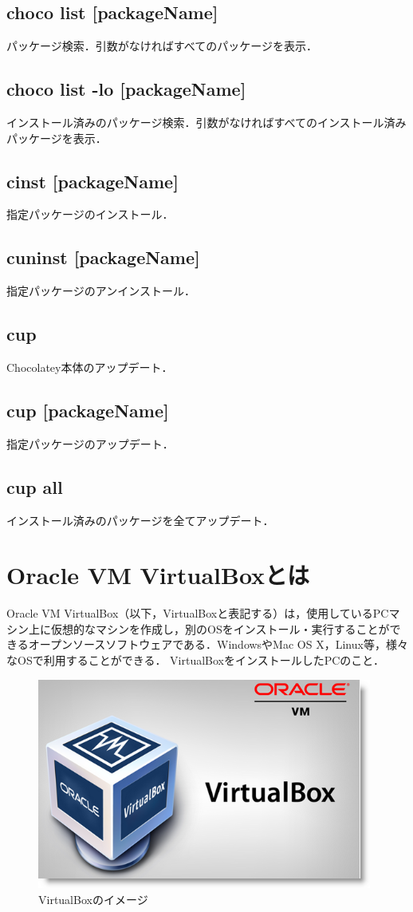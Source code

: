 \subsection{choco list [packageName]}
 パッケージ検索．引数がなければすべてのパッケージを表示．
\subsection{choco list -lo [packageName] }
インストール済みのパッケージ検索．引数がなければすべてのインストール済みパッケージを表示．
\subsection{cinst [packageName]}
 指定パッケージのインストール．
\subsection{cuninst [packageName]}
 指定パッケージのアンインストール．
\subsection{cup}
 Chocolatey本体のアップデート．
\subsection{cup [packageName]}
 指定パッケージのアップデート．
\subsection{cup all}
 インストール済みのパッケージを全てアップデート．
\clearpage

\section{Oracle VM VirtualBoxとは}
Oracle VM VirtualBox（以下，VirtualBoxと表記する）は，使用しているPCマシン上に仮想的なマシンを作成し，別のOSをインストール・実行することができるオープンソースソフトウェアである．WindowsやMac OS X，Linux等，様々なOSで利用することができる．
VirtualBoxをインストールしたPCのこと．
\begin{figure}[htb]
\centering
\includegraphics[width=11cm]{05.png}
\caption{VirtualBoxのイメージ}\label{5}
\end{figure}

